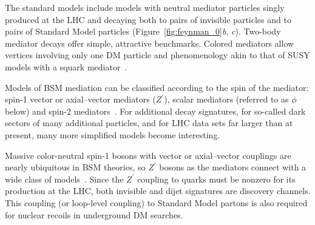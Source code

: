 \documentclass{ar-1col}
\newcommand{\IP}{invisible particle}
\newcommand{\Zprime}{\ensuremath{{Z}^\prime}\xspace}
\begin{document}
The standard models include models with neutral mediator particles
singly produced at the LHC and decaying both to pairs of {\IP}s and to
pairs of Standard Model particles (Figure~\ref{fig:feynman_0}{\em b},{\em
c}). Two-body mediator decays offer simple, attractive benchmarks.
Colored mediators allow vertices involving only one DM particle
and phenomenology akin to that of SUSY models with a squark
mediator~\cite{Papucci:2014iwa,An:2013xka,Bell:2012rg}.

Models of BSM mediation can be classified according to the spin of
the mediator: spin-1 vector or axial--vector mediators (\Zprime),
scalar mediators (referred to as $\phi$ below) and spin-2
mediators~\cite{Han:2015cty}.
For additional decay signatures, for so-called dark sectors of many
additional particles, and for LHC data sets far larger than at
present, many more simplified models become interesting.

{Massive color-neutral spin-1 bosons with vector or
axial--vector couplings} are nearly ubiquitous in BSM theories, so
\Zprime bosons as the mediators connect with a wide class of
models~\cite{Shoemaker:2011vi}. Since the \Zprime coupling to
quarks must be nonzero for its production at the LHC, both
invisible and dijet signatures are discovery channels. This
coupling (or loop-level coupling) to Standard Model partons is also required
for nuclear recoils in underground DM searches.
\end{document}
